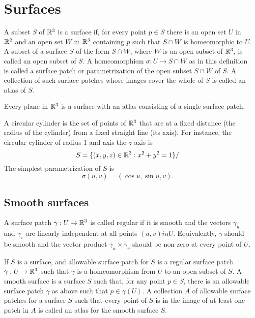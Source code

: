 \section{Surfaces}

\begin{defn}
  A subset $S$ of $\mathbb{R}^3$ is a surface if, for every point $p \in S$
  there is an open set $U$ in $\mathbb{R}^2$ and an open set $W$ in $\mathbb{R}^3$
  containing $p$ such that $S \cap W$ is homeomorphic to $U$.
  A subset of a surface $S$ of the form $S \cap W$, where $W$
  is an open subset of $\mathbb{R}^3$, is called an open subset of $S$.
  A homeomorphism $\sigma: U \to S \cap W$ as in this definition
  is called a surface patch or parametrization of
  the open subset $S \cap W$ of $S$.
  A collection of such surface patches whose images cover the
  whole of $S$ is called an atlas of $S$.
\end{defn}

\begin{example}
  Every plane in $\mathbb{R}^3$ is a surface with an atlas consisting of a single surface patch.
\end{example}

\begin{example}
  A circular cylinder is the set of points of $\mathbb{R}^3$ that are at a fixed distance
  (the radius of the cylinder) from a fixed straight line (its axis).
  For instance, the circular cylinder of radius $1$ and axis the $z$-axis is
  \[
    S = \{(x, y, z) \in \mathbb{R}^3 : x^2 + y^2 = 1\}/
  \]
  The simplest parametrization of $S$ is 
  \[
    \sigma(u, v) = (\cos u, \sin u, v).
  \]
\end{example}


\subsection{Smooth surfaces}

\begin{defn}
  A surface patch $\gamma: U \to \mathbb{R}^3$ is called regular if
  it is smooth and the vectors $\gamma_u$ and $\gamma_v$ are
  linearly independent at all points $(u, v) in U$.
  Equivalently, $\gamma$ should be smooth and the vector
  product $\gamma_u \times \gamma_v$ should be non-zero at every point of $U$.
\end{defn}

\begin{defn}
  If $S$ is a surface, and allowable surface patch for $S$ is a regular
  surface patch $\gamma: U \to \mathbb{R}^3$ such that $\gamma$ is a
  homeomorphism from $U$ to an open subset of $S$.
  A smooth surface is a surface $S$ such that, for any point $p \in S$,
  there is an allowable surface patch $\gamma$ as above such that $p \in \gamma(U)$.
  A collection $A$ of allowable surface patches for a surface $S$ such that
  every point of $S$ is in the image of at least one patch in $A$
  is called an atlas for the smooth surface $S$.
\end{defn}

